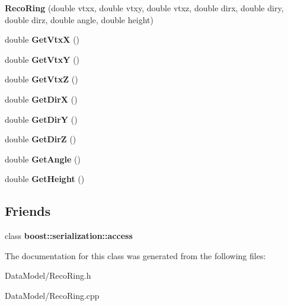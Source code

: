 \begin{DoxyCompactItemize}
\item 
\hypertarget{classRecoRing_aad9148ea7aaaca9b6f4509a8dd8e75f8}{{\bfseries Reco\-Ring} (double vtxx, double vtxy, double vtxz, double dirx, double diry, double dirz, double angle, double height)}\label{classRecoRing_aad9148ea7aaaca9b6f4509a8dd8e75f8}

\item 
\hypertarget{classRecoRing_a8b0e0f398d68a61999efacf0662af29a}{double {\bfseries Get\-Vtx\-X} ()}\label{classRecoRing_a8b0e0f398d68a61999efacf0662af29a}

\item 
\hypertarget{classRecoRing_a95779c64bb634cd25f509f31f2db7430}{double {\bfseries Get\-Vtx\-Y} ()}\label{classRecoRing_a95779c64bb634cd25f509f31f2db7430}

\item 
\hypertarget{classRecoRing_aa7aab08808cf6477def588a4cc4cfcb4}{double {\bfseries Get\-Vtx\-Z} ()}\label{classRecoRing_aa7aab08808cf6477def588a4cc4cfcb4}

\item 
\hypertarget{classRecoRing_a1056b0bc240d4dfd2babdf634dd0320d}{double {\bfseries Get\-Dir\-X} ()}\label{classRecoRing_a1056b0bc240d4dfd2babdf634dd0320d}

\item 
\hypertarget{classRecoRing_aa7604833daff752d38c6d8751522c257}{double {\bfseries Get\-Dir\-Y} ()}\label{classRecoRing_aa7604833daff752d38c6d8751522c257}

\item 
\hypertarget{classRecoRing_afed3c82a79e94a6ffdbb44702c00a230}{double {\bfseries Get\-Dir\-Z} ()}\label{classRecoRing_afed3c82a79e94a6ffdbb44702c00a230}

\item 
\hypertarget{classRecoRing_a297982bcc3c73a3e18a06118be109747}{double {\bfseries Get\-Angle} ()}\label{classRecoRing_a297982bcc3c73a3e18a06118be109747}

\item 
\hypertarget{classRecoRing_a8f85725e258ca053ca6916946fb35765}{double {\bfseries Get\-Height} ()}\label{classRecoRing_a8f85725e258ca053ca6916946fb35765}

\end{DoxyCompactItemize}
\subsection*{Friends}
\begin{DoxyCompactItemize}
\item 
\hypertarget{classRecoRing_ac98d07dd8f7b70e16ccb9a01abf56b9c}{class {\bfseries boost\-::serialization\-::access}}\label{classRecoRing_ac98d07dd8f7b70e16ccb9a01abf56b9c}

\end{DoxyCompactItemize}


The documentation for this class was generated from the following files\-:\begin{DoxyCompactItemize}
\item 
Data\-Model/Reco\-Ring.\-h\item 
Data\-Model/Reco\-Ring.\-cpp\end{DoxyCompactItemize}
